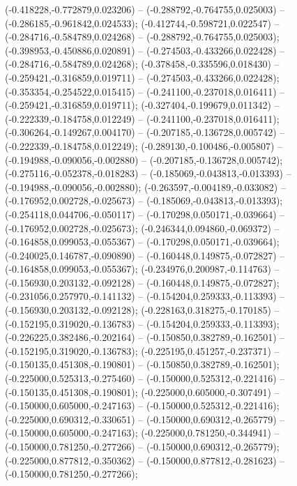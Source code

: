  (-0.418228,-0.772879,0.023206) -- (-0.288792,-0.764755,0.025003) -- (-0.286185,-0.961842,0.024533);
 (-0.412744,-0.598721,0.022547) -- (-0.284716,-0.584789,0.024268) -- (-0.288792,-0.764755,0.025003);
 (-0.398953,-0.450886,0.020891) -- (-0.274503,-0.433266,0.022428) -- (-0.284716,-0.584789,0.024268);
 (-0.378458,-0.335596,0.018430) -- (-0.259421,-0.316859,0.019711) -- (-0.274503,-0.433266,0.022428);
 (-0.353354,-0.254522,0.015415) -- (-0.241100,-0.237018,0.016411) -- (-0.259421,-0.316859,0.019711);
 (-0.327404,-0.199679,0.011342) -- (-0.222339,-0.184758,0.012249) -- (-0.241100,-0.237018,0.016411);
 (-0.306264,-0.149267,0.004170) -- (-0.207185,-0.136728,0.005742) -- (-0.222339,-0.184758,0.012249);
 (-0.289130,-0.100486,-0.005807) -- (-0.194988,-0.090056,-0.002880) -- (-0.207185,-0.136728,0.005742);
 (-0.275116,-0.052378,-0.018283) -- (-0.185069,-0.043813,-0.013393) -- (-0.194988,-0.090056,-0.002880);
 (-0.263597,-0.004189,-0.033082) -- (-0.176952,0.002728,-0.025673) -- (-0.185069,-0.043813,-0.013393);
 (-0.254118,0.044706,-0.050117) -- (-0.170298,0.050171,-0.039664) -- (-0.176952,0.002728,-0.025673);
 (-0.246344,0.094860,-0.069372) -- (-0.164858,0.099053,-0.055367) -- (-0.170298,0.050171,-0.039664);
 (-0.240025,0.146787,-0.090890) -- (-0.160448,0.149875,-0.072827) -- (-0.164858,0.099053,-0.055367);
 (-0.234976,0.200987,-0.114763) -- (-0.156930,0.203132,-0.092128) -- (-0.160448,0.149875,-0.072827);
 (-0.231056,0.257970,-0.141132) -- (-0.154204,0.259333,-0.113393) -- (-0.156930,0.203132,-0.092128);
 (-0.228163,0.318275,-0.170185) -- (-0.152195,0.319020,-0.136783) -- (-0.154204,0.259333,-0.113393);
 (-0.226225,0.382486,-0.202164) -- (-0.150850,0.382789,-0.162501) -- (-0.152195,0.319020,-0.136783);
 (-0.225195,0.451257,-0.237371) -- (-0.150135,0.451308,-0.190801) -- (-0.150850,0.382789,-0.162501);
 (-0.225000,0.525313,-0.275460) -- (-0.150000,0.525312,-0.221416) -- (-0.150135,0.451308,-0.190801);
 (-0.225000,0.605000,-0.307491) -- (-0.150000,0.605000,-0.247163) -- (-0.150000,0.525312,-0.221416);
 (-0.225000,0.690312,-0.330651) -- (-0.150000,0.690312,-0.265779) -- (-0.150000,0.605000,-0.247163);
 (-0.225000,0.781250,-0.344941) -- (-0.150000,0.781250,-0.277266) -- (-0.150000,0.690312,-0.265779);
 (-0.225000,0.877812,-0.350362) -- (-0.150000,0.877812,-0.281623) -- (-0.150000,0.781250,-0.277266);
